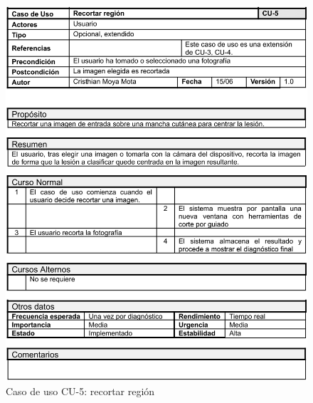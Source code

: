   \begin{figure}[H]
	\centering
	\includegraphics[scale=0.85]{imagenes/cu-5.png}
	\caption{Caso de uso CU-5: recortar región}
	\label{fig:cu5}
\end{figure}

